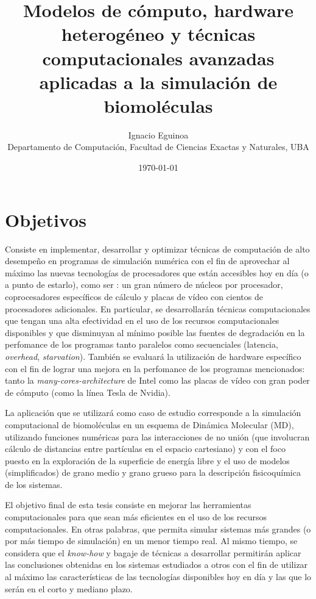 \documentclass[a4paper,10pt]{article}
\title{Modelos de c\'omputo, hardware heterog\'eneo y t\'ecnicas computacionales avanzadas aplicadas a la simulaci\'on de biomol\'eculas}
\author{Ignacio Eguinoa \\ 
\small Departamento de Computaci\'on, Facultad de Ciencias Exactas y Naturales, UBA
}
\date{\today}
\begin{document}
\maketitle


\section*{Objetivos} 
   
Consiste en implementar, desarrollar y optimizar t\'ecnicas de computaci\'on de alto desempe\~no en programas de simulaci\'on num\'erica con el fin de aprovechar al m\'aximo las nuevas tecnolog\'ias de procesadores que est\'an accesibles hoy en d\'ia (o a punto de estarlo), como ser : un gran n\'umero de n\'ucleos por procesador, coprocesadores espec\'ificos de c\'alculo y placas de v\'ideo con cientos de procesadores adicionales. 
En particular, se desarrollar\'an t\'ecnicas computacionales que tengan una alta efectividad en el uso de los recursos computacionales disponibles y que disminuyan al m\'inimo posible las fuentes de degradaci\'on en la perfomance de los programas tanto paralelos como secuenciales (latencia, \emph{overhead}, \emph{starvation}). 
Tambi\'en se evaluar\'a la utilizaci\'on de hardware espec\'ifico con el fin de lograr una mejora en la perfomance de los programas mencionados: tanto la \emph{many-cores-architecture} de Intel como las placas de v\'ideo con gran poder de c\'omputo (como la l\'inea Tesla de Nvidia).

La aplicaci\'on que se utilizar\'a como caso de estudio corresponde a la simulaci\'on computacional de biomol\'eculas en un esquema de Din\'amica Molecular (MD), utilizando funciones num\'ericas para las interacciones de no uni\'on (que involucran c\'alculo de distancias entre part\'iculas en el espacio cartesiano) y con el foco puesto en la exploraci\'on de la superficie de energ\'ia libre y el uso de modelos (simplificados) de grano medio y grano grueso para la descripci\'on fisicoqu\'imica de los sistemas.  

El objetivo final de esta tesis consiste en mejorar las herramientas computacionales para que sean m\'as eficientes en el uso de los recursos computacionales. 
En otras palabras, que permita simular sistemas m\'as grandes (o por m\'as tiempo de simulaci\'on) en un menor tiempo real. 
Al mismo tiempo, se considera que el \emph{know-how} y bagaje de t\'ecnicas a desarrollar permitir\'an aplicar las conclusiones obtenidas en los sistemas estudiados a otros con el fin de utilizar al m\'aximo las caracter\'isticas de las tecnolog\'ias disponibles hoy en d\'ia y las que lo ser\'an en el corto y mediano plazo.
\end{document}
